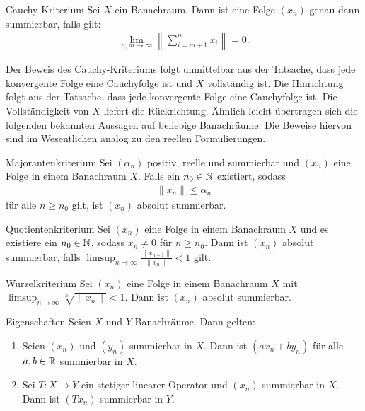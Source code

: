 \begin{genericthm}{Cauchy-Kriterium}\label{th:chauchy_crit}
	Sei $ X $ ein Banachraum.
	Dann ist eine Folge $ (x_n) $ genau dann summierbar, falls gilt:
	\begin{align*}
		\lim\limits_{n,m \to \infty} \left\| \sum \limits_{i= m+1}^n x_i \right\| = 0.
	\end{align*}
\end{genericthm}

Der Beweis des Cauchy-Kriteriums folgt unmittelbar aus der Tatsache, dass jede konvergente Folge eine Cauchyfolge ist und $ X $ vollständig ist.
Die Hinrichtung folgt aus der Tatsache, dass jede konvergente Folge eine Cauchyfolge ist.
Die Vollständigkeit von $ X $ liefert die Rückrichtung. 
Ähnlich leicht übertragen sich die folgenden bekannten Aussagen auf beliebige Banachräume.
Die Beweise hiervon sind im Wesentlichen analog zu den reellen Formulierungen.

\begin{genericthm}{Majorantenkriterium}
	Sei $ (\alpha_n) $ positiv, reelle und summierbar und $ (x_n) $ eine Folge in einem Banachraum $ X $.
	Falls ein $ n_0 \in \mathbb{N} $ existiert, sodass
	\begin{align}
		 \| x_n \| \leq \alpha_n
	\end{align}
	für alle $ n \geq n_0 $ gilt, ist $ (x_n) $ absolut summierbar.
\end{genericthm}


\begin{genericthm}{Quotientenkriterium}
	Sei $ (x_n) $ eine Folge in einem Banachraum $ X $ und es existiere ein $ n_0 \in \mathbb{N} $, sodass $ x_n \neq 0  $ für $ n \geq n_0 $.
	Dann ist $ (x_n) $ absolut summierbar, falls $ \limsup_{n \to \infty} \frac{\|x_{n+1} \|}{\|x_n \|} < 1  $ gilt.
\end{genericthm}

\begin{genericthm}{Wurzelkriterium}
	Sei $ (x_n) $ eine Folge in einem Banachraum $ X $ mit $ \limsup_{n \to \infty} \sqrt[n]{\|x_n \|} < 1  $.
	Dann ist $ (x_n) $ absolut summierbar.
\end{genericthm}

\begin{genericthm}{Eigenschaften}
	Seien $ X $ und $ Y $ Banachräume. Dann gelten:
	\begin{enumerate}
		\item Seien $ (x_n) $ und $ (y_n) $ summierbar in $ X $. Dann ist $ (a x_n + b y_n) $ für alle $ a,b \in \mathbb{R} $ summierbar in $ X $.
		
		
		
		\item 
		Sei $ T : X \to Y $ ein stetiger linearer Operator und $ (x_n) $ summierbar in $ X $.
		Dann ist $ (Tx_n) $ summierbar in $ Y $.
	\end{enumerate}
\end{genericthm}

